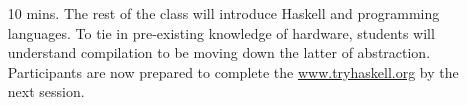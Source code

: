 \documentclass[11pt]{article}
\begin{document}
\begin{itemize}
  \item[10 mins.] The rest of the class will introduce Haskell and
    programming languages. To tie in pre-existing knowledge of hardware,
    students will understand compilation to be moving down the latter of
    abstraction. Participants are now prepared to complete the
    \url{www.tryhaskell.org} by the next session.
\end{itemize}
\end{document}
